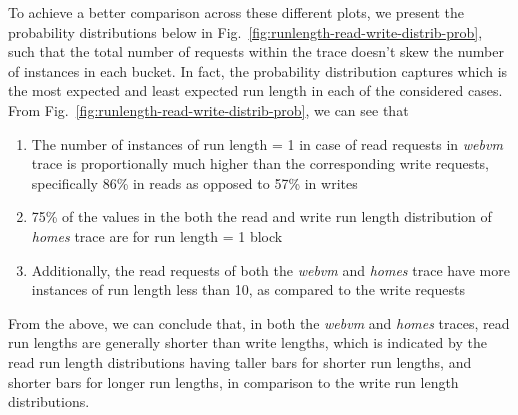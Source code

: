 To achieve a better comparison across these different plots, we present the
probability distributions below
in Fig.~\ref{fig:runlength-read-write-distrib-prob}, such that the total number of requests 
within the trace doesn't skew the number of instances in each bucket.
In fact, the probability distribution captures which is the most expected
and least expected run length in each of the considered cases.
From Fig.~\ref{fig:runlength-read-write-distrib-prob}, we can see that
\begin{enumerate}
 \item The number of instances of run length = 1 in case of read requests in \textit{webvm}
		trace is proportionally much higher than the corresponding write requests, 
		specifically 86\% in reads as opposed to 57\% in writes
 \item 75\% of the values in the both the read and write run 
      length distribution of \textit{homes} trace are for run length = 1 block
 \item Additionally, the read requests of both the \textit{webvm} and \textit{homes} trace
      have more instances
      of run length less than 10, as compared to the write requests
\end{enumerate}
From the above, we can conclude that, in both the \textit{webvm} and \textit{homes} traces,
read run lengths are generally shorter than write lengths, which is indicated
by the read run length distributions having taller bars for shorter run lengths,
and shorter bars for longer run lengths, in comparison to the write run length
distributions.



